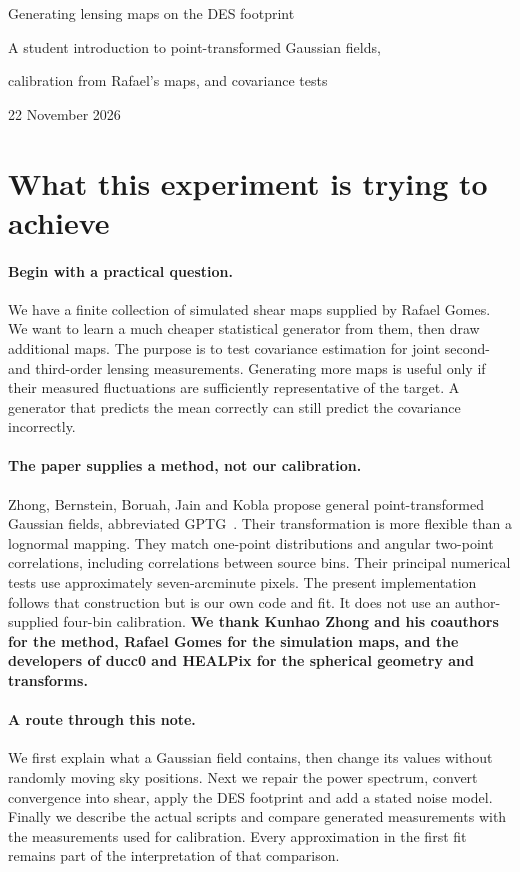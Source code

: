 \documentclass[11pt]{article}
\begin{document}
\begin{center}
{\LARGE Generating lensing maps on the DES footprint\par}
\vspace{0.6em}
{\large A student introduction to point-transformed Gaussian fields,\par}
{\large calibration from Rafael's maps, and covariance tests\par}
\vspace{0.5em}
22 November 2026
\end{center}

\section{What this experiment is trying to achieve}
\paragraph{Begin with a practical question.}
We have a finite collection of simulated shear maps supplied by Rafael
Gomes. We want to learn a much cheaper statistical generator from them,
then draw additional maps. The purpose is to test covariance estimation
for joint second- and third-order lensing measurements. Generating more
maps is useful only if their measured fluctuations are sufficiently
representative of the target. A generator that predicts the mean correctly
can still predict the covariance incorrectly.

\paragraph{The paper supplies a method, not our calibration.}
Zhong, Bernstein, Boruah, Jain and Kobla propose general point-transformed
Gaussian fields, abbreviated GPTG~\cite{zhong}. Their transformation is
more flexible than a lognormal mapping. They match one-point distributions
and angular two-point correlations, including correlations between source
bins. Their principal numerical tests use approximately seven-arcminute
pixels. The present implementation follows that construction but is our
own code and fit. It does not use an author-supplied four-bin calibration.
\textbf{We thank Kunhao Zhong and his coauthors for the method, Rafael Gomes
for the simulation maps, and the developers of ducc0 and HEALPix for the
spherical geometry and transforms.}

\paragraph{A route through this note.}
We first explain what a Gaussian field contains, then change its values
without randomly moving sky positions. Next we repair the power spectrum,
convert convergence into shear, apply the DES footprint and add a stated
noise model. Finally we describe the actual scripts and compare generated
measurements with the measurements used for calibration. Every approximation
in the first fit remains part of the interpretation of that comparison.
\end{document}
